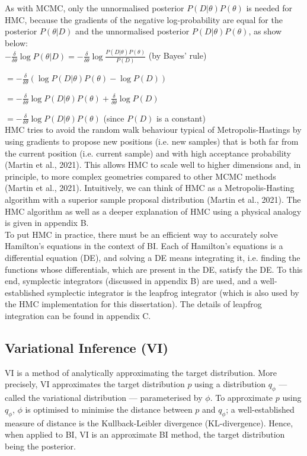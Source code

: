 \documentclass[conference]{IEEEtran}
\begin{document}
As with MCMC, only the unnormalised posterior $P(D|\theta)P(\theta)$ is needed for HMC, because the gradients of the negative log-probability are equal for the posterior $P(\theta|D)$ and the unnormalised posterior $P(D|\theta)P(\theta)$, as show below:\\

$\displaystyle - \frac{\delta}{\delta \theta} \log P(\theta|D) = - \frac{\delta}{\delta \theta} \log \frac{P(D|\theta)P(\theta)}{P(D)}$ (by Bayes' rule)

$\displaystyle = - \frac{\delta}{\delta \theta} (\log P(D|\theta) P(\theta) - \log P(D))$

$\displaystyle = - \frac{\delta}{\delta \theta} \log P(D|\theta) P(\theta) + \frac{\delta}{\delta \theta} \log P(D)$

$\displaystyle = - \frac{\delta}{\delta \theta} \log P(D|\theta) P(\theta)$ (since $P(D)$ is a constant)\\

HMC tries to avoid the random walk behaviour typical of Metropolis-Hastings by using gradients to propose new positions (i.e. new samples) that is both far from the current position (i.e. current sample) and with high acceptance probability (Martin et al., 2021). This allows HMC to scale well to higher dimensions and, in principle, to more complex geometries compared to other MCMC methods (Martin et al., 2021). Intuitively, we can think of HMC as a Metropolis-Hasting algorithm with a superior sample proposal distribution (Martin et al., 2021). The HMC algorithm as well as a deeper explanation of HMC using a physical analogy is given in appendix B.\\

To put HMC in practice, there must be an efficient way to accurately solve Hamilton's equations in the context of BI. Each of Hamilton's equations is a differential equation (DE), and solving a DE means integrating it, i.e. finding the functions whose differentials, which are present in the DE, satisfy the DE. To this end, symplectic integrators (discussed in appendix B) are used, and a well-established symplectic integrator is the leapfrog integrator (which is also used by the HMC implementation for this dissertation). The details of leapfrog integration can be found in appendix C.

\subsection{Variational Inference (VI)}
VI is a method of analytically approximating the target distribution. More precisely, VI approximates the target distribution $p$ using a distribution $q_\phi$ — called the variational distribution — parameterised by $\phi$. To approximate $p$ using $q_{\phi}$, $\phi$ is optimised to minimise the distance between $p$ and $q_{\phi}$; a well-established measure of distance is the Kullback-Leibler divergence (KL-divergence). Hence, when applied to BI, VI is an approximate BI method, the target distribution being the posterior.\\
\end{document}
